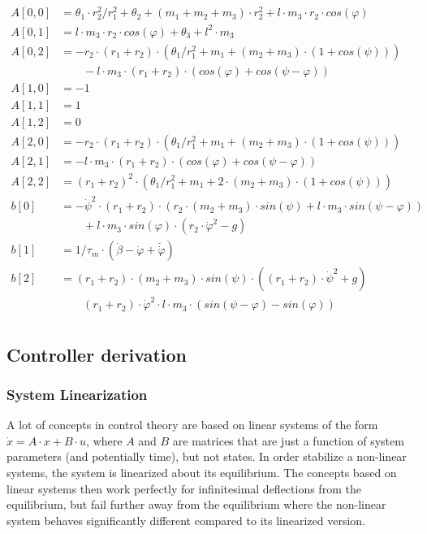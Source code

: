 \documentclass{article}
\begin{document}
\begin{align*}
A[0,0] &= \theta_1 \cdot r_2^2/r_1^2 + \theta_2 + (m_1 + m_2 + m_3) \cdot r_2^2 + l \cdot m_3 \cdot r_2 \cdot cos(\varphi)\\
A[0,1] &= l \cdot m_3 \cdot r_2 \cdot cos(\varphi) + \theta_3 + l^2 \cdot m_3 \\
A[0,2] &= -r_2 \cdot (r_1 + r_2) \cdot (\theta_1/r_1^2  + m_1 + (m_2+m_3) \cdot (1+cos(\psi))) \\
&\qquad -l \cdot m_3 \cdot (r_1 + r_2) \cdot (cos(\varphi) + cos(\psi - \varphi)) \\
A[1,0] &= -1 \\
A[1,1] &= 1 \\
A[1,2] &= 0 \\
A[2,0] &= -r_2 \cdot (r_1 + r_2) \cdot (\theta_1/r_1^2  + m_1 + (m_2+m_3) \cdot (1+cos(\psi))) \\
A[2,1] &= -l \cdot m_3 \cdot (r_1 + r_2) \cdot (cos(\varphi) + cos(\psi - \varphi)) \\
A[2,2] &= (r_1 + r_2)^2 \cdot (\theta_1/r_1^2 + m_1 + 2 \cdot (m_2+m_3) \cdot (1+cos(\psi))) \\
b[0] &= - \dot{\psi}^2 \cdot (r_1 + r_2) \cdot ( r_2 \cdot (m_2+m_3) \cdot sin(\psi) +  l \cdot m_3 \cdot sin(\psi - \varphi)) \\
&\qquad  + l \cdot m_3 \cdot sin(\varphi) \cdot (r_2 \cdot  \dot{\varphi}^2 - g) \\
b[1] &= 1/\tau_m \cdot (\dot{\beta} - \dot{\varphi} + \breve{\dot{\varphi}}) \\
b[2] &= (r_1 + r_2) \cdot (m_2+m_3) \cdot sin(\psi) \cdot ((r_1 + r_2) \cdot \dot{\psi}^2 + g) \\
&\qquad (r_1 + r_2) \cdot \dot{\varphi}^2 \cdot l \cdot m_3 \cdot (sin(\psi - \varphi)-sin(\varphi)) \\
\end{align*}

\subsection{Controller derivation}

\subsubsection{System Linearization}
\label{ss:syslin}
A lot of concepts in control theory are based on linear systems of the form $\dot{x} = A \cdot x + B \cdot u$, where $A$ and $B$ are matrices that are just a function of system parameters (and potentially time), but not states.
In order stabilize a non-linear systems, the system is linearized about its equilibrium.
The concepts based on linear systems then work perfectly for infinitesimal deflections from the equilibrium, but fail further away from the equilibrium where the non-linear system behaves significantly different compared to its linearized version.
\end{document}
